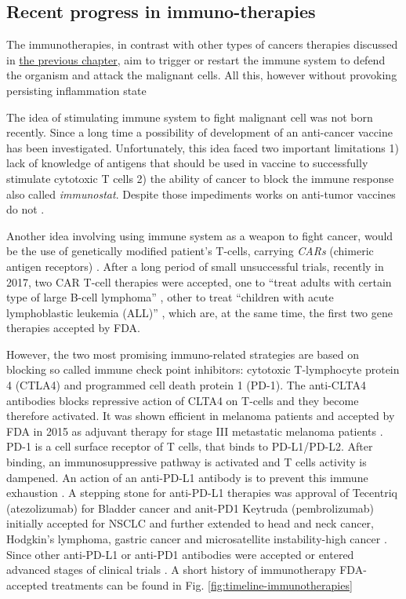 \documentclass[12pt,]{book}
\theoremstyle{definition}
\theoremstyle{definition}
\theoremstyle{definition}
\theoremstyle{remark}
\begin{document}
\hypertarget{recent-progress-in-immuno-therapies}{%
\subsection{Recent progress in
immuno-therapies}\label{recent-progress-in-immuno-therapies}}

The immunotherapies, in contrast with other types of cancers therapies
discussed in \protect\hyperlink{cancer_Therapies}{the previous chapter},
aim to trigger or restart the immune system to defend the organism and
attack the malignant cells. All this, however without provoking
persisting inflammation state \citep{Predina2013}

The idea of stimulating immune system to fight malignant cell was not
born recently. Since a long time a possibility of development of an
anti-cancer vaccine has been investigated. Unfortunately, this idea
faced two important limitations 1) lack of knowledge of antigens that
should be used in vaccine to successfully stimulate cytotoxic T cells 2)
the ability of cancer to block the immune response also called
\emph{immunostat}. Despite those impediments works on anti-tumor
vaccines do not \citep{Palucka2013}.

Another idea involving using immune system as a weapon to fight cancer,
would be the use of genetically modified patient's T-cells, carrying
\emph{CARs} (chimeric antigen receptors) \citep{Jackson2016}. After a
long period of small unsuccessful trials, recently in 2017, two CAR
T-cell therapies were accepted, one to ``treat adults with certain type
of large B-cell lymphoma'' \citep{FDACARTadult}, other to treat
``children with acute lymphoblastic leukemia (ALL)'' \citep{FDACARTALL}
, which are, at the same time, the first two gene therapies accepted by
FDA.

However, the two most promising immuno-related strategies are based on
blocking so called immune check point inhibitors: cytotoxic T-lymphocyte
protein 4 (CTLA4) and programmed cell death protein 1 (PD-1). The
anti-CLTA4 antibodies blocks repressive action of CLTA4 on T-cells and
they become therefore activated. It was shown efficient in melanoma
patients and accepted by FDA in 2015 as adjuvant therapy for stage III
metastatic melanoma patients \citep{FDACTLA4}. PD-1 is a cell surface
receptor of T cells, that binds to PD-L1/PD-L2. After binding, an
immunosuppressive pathway is activated and T cells activity is dampened.
An action of an anti-PD-L1 antibody is to prevent this immune exhaustion
\citep{Chen2017}. A stepping stone for anti-PD-L1 therapies was approval
of Tecentriq (atezolizumab) for Bladder cancer \citep{FDAPDL1Bladder}
and anit-PD1 Keytruda (pembrolizumab) initially accepted for NSCLC and
further extended to head and neck cancer, Hodgkin's lymphoma, gastric
cancer and microsatellite instability-high cancer \citep{FDAPDL1NSCLC}.
Since other anti-PD-L1 or anti-PD1 antibodies were accepted or entered
advanced stages of clinical trials \citep{Wolchok2015}. A short history
of immunotherapy FDA-accepted treatments can be found in Fig.
\ref{fig:timeline-immunotherapies}
\end{document}
